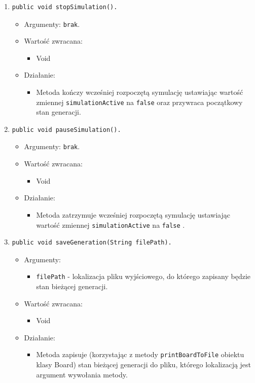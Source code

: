 \documentclass[a4paper,11pt, notitlepage ]{article}
\begin{document}
\begin{enumerate}
\item \begin{verbatim}public void stopSimulation(). \end{verbatim}
\begin{itemize}
\item Argumenty: \verb+brak+.
\item Wartość zwracana:
\begin{itemize}
\item Void
\end{itemize}
\item Działanie:
\begin{itemize}
\item Metoda kończy wcześniej rozpoczętą symulację ustawiając wartość zmiennej \verb+simulationActive+ na \verb+false+ oraz przywraca początkowy stan generacji.
\end{itemize}
\end{itemize}


\item \begin{verbatim}public void pauseSimulation(). \end{verbatim}
\begin{itemize}
\item Argumenty: \verb+brak+.
\item Wartość zwracana:
\begin{itemize}
\item Void
\end{itemize}
\item Działanie:
\begin{itemize}
\item Metoda zatrzymuje wcześniej rozpoczętą symulację ustawiając wartość zmiennej \verb+simulationActive+ na \verb+false+ .
\end{itemize}
\end{itemize}


\item \begin{verbatim}public void saveGeneration(String filePath). \end{verbatim}
\begin{itemize}
\item Argumenty:
\begin{itemize}
\item \verb+filePath+ - lokalizacja pliku wyjściowego, do którego zapisany będzie stan bieżącej generacji.
\end{itemize}
\item Wartość zwracana:
\begin{itemize}
\item Void
\end{itemize}
\item Działanie:
\begin{itemize}
\item Metoda zapisuje (korzystając z metody \verb+printBoardToFile+ obiektu klasy Board) stan bieżącej generacji do pliku, którego lokalizacją jest argument wywołania metody.
\end{itemize}
\end{itemize}




\end{enumerate}
\end{document}
